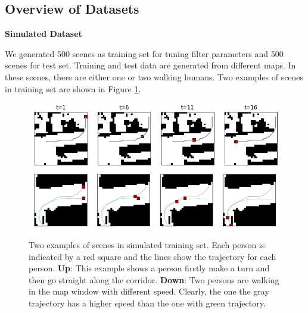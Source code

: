 \subsection{Overview of Datasets}

\textbf{Simulated Dataset}

We generated 500 scenes as training set for tuning filter parameters and 500 scenes for test set. Training and test data are generated from different maps. In these scenes, there are either one or two walking humans. Two examples of scenes in training set are shown in Figure \ref{fig:sample_scene_simulated}.

\begin{figure}[hp]
  \centering
  \includegraphics[width=.99\textwidth]{figures/simulated_dataset_1_persons_with_traj.png}
    \includegraphics[width=\textwidth]{figures/simulated_dataset_2_persons_with_traj.png}
    \caption[Two examples of scenes in simulated training set.]{Two examples of scenes in simulated training set. Each person is indicated by a red square and the lines show the trajectory for each person. \textbf{Up}: This example shows a person firstly make a turn and then go straight along the corridor. \textbf{Down}: Two persons are walking in the map window with different speed. Clearly, the one the gray trajectory has a higher speed than the one with green trajectory.}
    \label{fig:sample_scene_simulated}

    \vspace*{\floatsep}


\end{figure}
